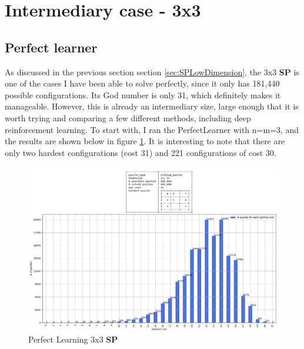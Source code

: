 \section{Intermediary case - 3x3}
\label{sec:S33}


\subsection{Perfect learner}
As discussed in the previous section section \ref{sec:SPLowDimension}, the 3x3 \textbf{SP} is one of the cases I have been able to solve perfectly, since it only has 181,440 possible configurations. Its God number is only 31, which definitely makes it manageable. However, this is already an intermediary size, large enough that it is worth trying and comparing a few different methods, including deep reinforcement learning. To start with, I ran the PerfectLearner with n=m=3, and the results are shown below in figure \ref{fig:33SPPerfectLearning}. It is interesting to note that there are only two hardest configurations (cost 31) and 221 configurations of cost 30.


\begin{landscape}
\centering\vspace*{\fill}
\begin{figure}[H]
\centering
\includegraphics[scale=0.7]{./Figures/33SPPerfectLearning.jpeg}
\caption[33SPPerfectLearning]{Perfect Learning 3x3 \textbf{SP}}
\label{fig:33SPPerfectLearning}
\end{figure}
\vfill
\end{landscape}
\restoregeometry




